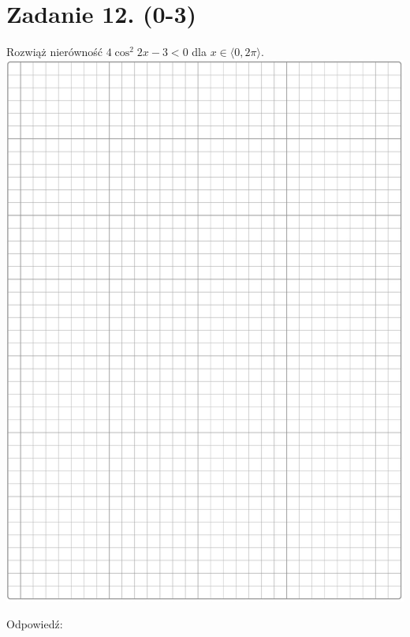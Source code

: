 \documentclass[10pt]{article}
\begin{document}
\section*{Zadanie 12. (0-3)}
Rozwiąż nierówność \(4 \cos ^{2} 2 x-3<0\) dla \(x \in\langle 0,2 \pi\rangle\).\\
\includegraphics[max width=\textwidth, center]{2024_11_21_06df787f12c5337a1fe8g-09}

Odpowiedź:
\end{document}
